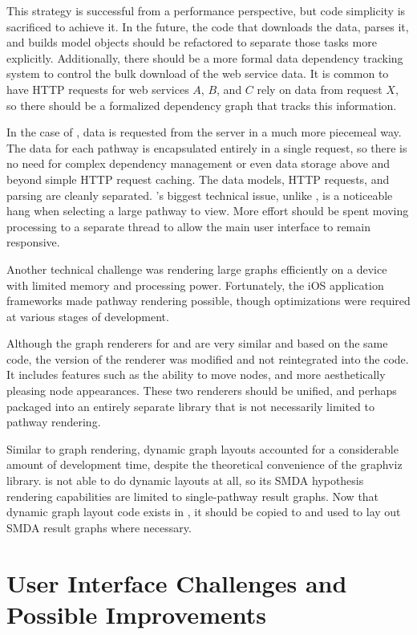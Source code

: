 This strategy is successful from a performance perspective, but code simplicity
is sacrificed to achieve it. In the future, the code that downloads the data,
parses it, and builds model objects should be refactored to separate those tasks
more explicitly. Additionally, there should be a more formal data dependency
tracking system to control the bulk download of the web service data. It is
common to have HTTP requests for web services $A$, $B$, and $C$ rely on data
from request $X$, so there should be a formalized dependency graph that tracks
this information.

In the case of \keggapp, data is requested from the \pathcasekegg server in a
much more piecemeal way. The data for each pathway is encapsulated entirely in a
single request, so there is no need for complex dependency management or even
data storage above and beyond simple HTTP request caching. The data models, HTTP
requests, and parsing are cleanly separated. \keggappp's biggest technical
issue, unlike \mawapp, is a noticeable hang when selecting a large pathway to
view. More effort should be spent moving processing to a separate thread to
allow the main user interface to remain responsive.

Another technical challenge was rendering large graphs efficiently on a device
with limited memory and processing power. Fortunately, the iOS application
frameworks made pathway rendering possible, though optimizations were required
at various stages of development.

Although the graph renderers for \mawapp and \keggapp are very similar and based
on the same code, the \keggapp version of the renderer was modified and not
reintegrated into the \mawapp code. It includes features such as the ability to
move nodes, and more aesthetically pleasing node appearances. These two
renderers should be unified, and perhaps packaged into an entirely separate
library that is not necessarily limited to pathway rendering.

Similar to graph rendering, dynamic graph layouts accounted for a considerable
amount of development time, despite the theoretical convenience of the graphviz
library. \mawapp is not able to do dynamic layouts at all, so its SMDA
hypothesis rendering capabilities are limited to single-pathway result graphs.
Now that dynamic graph layout code exists in \keggapp, it should be copied to
\mawapp and used to lay out SMDA result graphs where necessary.

\section{User Interface Challenges and Possible Improvements}

